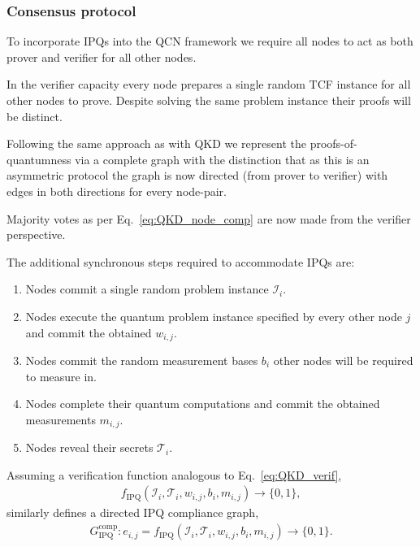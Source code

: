 \subsubsection{Consensus protocol}

To incorporate IPQs into the QCN framework we require all nodes to act as both prover and verifier for all other nodes.

In the verifier capacity every node prepares a single random TCF instance for all other nodes to prove. Despite solving the same problem instance their proofs will be distinct.

Following the same approach as with QKD we represent the proofs-of-quantumness via a complete graph with the distinction that as this is an asymmetric protocol the graph is now directed (from prover to verifier) with edges in both directions for every node-pair.

Majority votes as per Eq.~\eqref{eq:QKD_node_comp} are now made from the verifier perspective.

The additional synchronous steps required to accommodate IPQs are:
\begin{enumerate}
	\item Nodes commit a single random problem instance $\mathcal{I}_i$.
	\item Nodes execute the quantum problem instance specified by every other node $j$ and commit the obtained $w_{i,j}$.
	\item Nodes commit the random measurement bases $b_i$ other nodes will be required to measure in.
	\item Nodes complete their quantum computations and commit the obtained measurements $m_{i,j}$.
	\item Nodes reveal their secrets $\mathcal{T}_i$.
\end{enumerate}

Assuming a verification function analogous to Eq.~\eqref{eq:QKD_verif},
\begin{align}
	f_\mathrm{IPQ}(\mathcal{I}_i,\mathcal{T}_i,w_{i,j},b_i,m_{i,j}) \to \{0,1\},
\end{align}
similarly defines a directed IPQ compliance graph,
\begin{align}
	G_\mathrm{IPQ}^{\mathrm{comp}}: e_{i,j} = f_\mathrm{IPQ}(\mathcal{I}_i,\mathcal{T}_i,w_{i,j},b_i,m_{i,j}) \to \{0,1\}.
\end{align}


